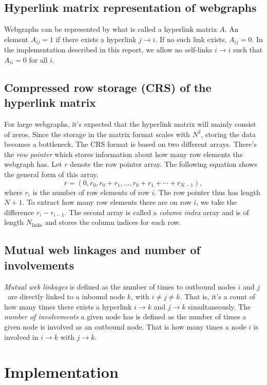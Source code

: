 \documentclass[english,notitlepage, reprint]{revtex4-1}  %
\begin{document}
\subsection*{Hyperlink matrix representation of webgraphs}
Webgraphs can be represented by what is called a hyperlink matrix $A$. An element $A_{ij} = 1$ if there exists a hyperlink $j \to i$. If no such link exists, $A_{ij} = 0$. In the implementation described in this report, we allow no self-links $i \to i$ such that $A_{ii} = 0$ for all $i$.

\subsection*{Compressed row storage (CRS) of the hyperlink matrix}
For large webgraphs, it's expected that the hyperlink matrix will mainly consist of zeros. Since the storage in the matrix format scales with $N^2$, storing the data becomes a bottleneck. The CRS format is based on two different arrays. There's the \textit{row pointer} which stores information about how many row elements the webgraph has. Let $r$ denote the row pointer array. The following equation shows the general form of this array.
\begin{equation}\label{eq:row_pointer}
	r = (0, r_0, r_0 + r_1,..., r_0 + r_1 + \cdots + r_{N-1}),
\end{equation}
where $r_i$ is the number of row elements of row $i$. The row pointer thus has length $N+1$. To extract how many row elements there are on row $i$, we take the difference $r_{i}-r_{i-1}$. The second array is called a \textit{column index} array and is of length $N_\text{links}$ and stores the column indices for each row.

\subsection*{Mutual web linkages and number of involvements}
\textit{Mutual web linkages} is defined as the number of times to outbound nodes $i$ and $j$ are directly linked to a inbound node $k$, with $i \neq j \neq k$. That is, it's a count of how many times there exists a hyperlink $i \to k$ and $j\to k$ simultaneously. The \textit{number of involvements} a given node has is defined as the number of times a given node is involved as an outbound node. That is how many times a node $i$ is involved in $i \to k$ with $j\to k$.

\section{Implementation}
\end{document}
